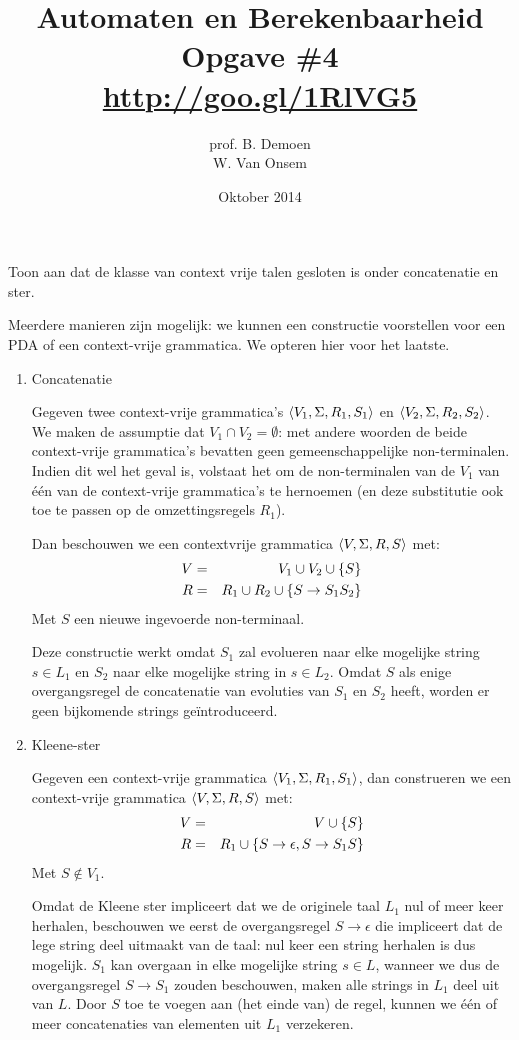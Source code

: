 \documentclass[a4paper]{article}
\title{Automaten en Berekenbaarheid\\Opgave \#4\\\url{http://goo.gl/1RlVG5}}
\author{prof. B. Demoen\\W. Van Onsem}
\date{Oktober 2014}
\begin{document}
\maketitle

\begin{question}
Toon aan dat de klasse van context vrije talen gesloten is onder concatenatie en ster.

\begin{answer}
Meerdere manieren zijn mogelijk: we kunnen een constructie voorstellen voor een PDA of een context-vrije grammatica.
We opteren hier voor het laatste.
\begin{enumerate}
 \item Concatenatie
 \begin{construction}
  Gegeven twee context-vrije grammatica's $\left\langle V_1,\Sigma,R_1,S_1 \right\rangle$ en $\left\langle V_2,\Sigma,R_2,S_2 \right\rangle$. We maken de assumptie
  dat $V_1\cap V_2=\emptyset$: met andere woorden de beide context-vrije grammatica's bevatten geen gemeenschappelijke
  non-terminalen. Indien dit wel het geval is, volstaat het om de non-terminalen van de $V_1$ van \'e\'en van de context-vrije
  grammatica's te hernoemen (en deze substitutie ook toe te passen op de omzettingsregels $R_1$).
  
  Dan beschouwen we een contextvrije grammatica $\left\langle V,\Sigma,R,S \right\rangle$ met:
  \begin{eqnarray}
   V&=&V_1\cup V_2\cup\left\{ S \right\}\\
   R&=&R_1\cup R_2\cup\left\{ S\rightarrow S_1S_2 \right\}
  \end{eqnarray}
  Met $S$ een nieuwe ingevoerde non-terminaal.
 \end{construction}
 Deze constructie werkt omdat $S_1$ zal evolueren naar elke mogelijke string $s\in L_1$ en $S_2$ naar elke mogelijke
 string in $s\in L_2$. Omdat $S$ als enige overgangsregel de concatenatie van evoluties van $S_1$ en $S_2$ heeft, worden
 er geen bijkomende strings ge\"introduceerd.
 \item Kleene-ster
 \begin{construction}
  Gegeven een context-vrije grammatica $\left\langle V_1,\Sigma,R_1,S_1 \right\rangle$, dan construeren we een context-vrije grammatica $\left\langle V,\Sigma,R,S \right\rangle$
  met:
  \begin{eqnarray}
   V&=&V\cup\left\{ S \right\}\\
   R&=&R_1\cup\left\{ S\rightarrow\epsilon,S\rightarrow S_1S \right\}
  \end{eqnarray}
  Met $S\notin V_1$.
 \end{construction}
 Omdat de Kleene ster impliceert dat we de originele taal $L_1$ nul of meer keer herhalen, beschouwen we eerst de overgangsregel $S\rightarrow\epsilon$ die
 impliceert dat de lege string deel uitmaakt van de taal: nul keer een string herhalen is dus mogelijk. $S_1$ kan overgaan in elke mogelijke string
 $s\in L$, wanneer we dus de overgangsregel $S\rightarrow S_1$ zouden beschouwen, maken alle strings in $L_1$ deel uit van $L$. Door $S$ toe te voegen aan (het
 einde van) de regel, kunnen we \'e\'en of meer concatenaties van elementen uit $L_1$ verzekeren.
\end{enumerate}
\end{answer}
\end{question}
\end{document}
